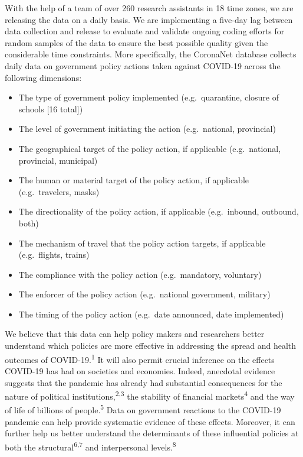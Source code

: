\documentclass[
]{article}
\providecommand{\tightlist}{%
  \setlength{\itemsep}{0pt}\setlength{\parskip}{0pt}}
\begin{document}
With the help of a team of over 260 research assistants in 18 time zones, we are releasing the data on a daily basis. We are implementing a five-day lag between data collection and release to evaluate and validate ongoing coding efforts for random samples of the data to ensure the best possible quality given the considerable time constraints. More specifically, the CoronaNet database collects daily data on government policy actions taken against COVID-19 across the following dimensions:

\begin{itemize}
\tightlist
\item
  The type of government policy implemented (e.g.~quarantine, closure of schools {[}16 total{]})
\item
  The level of government initiating the action (e.g.~national, provincial)
\item
  The geographical target of the policy action, if applicable (e.g.~national, provincial, municipal)
\item
  The human or material target of the policy action, if applicable (e.g.~travelers, masks)
\item
  The directionality of the policy action, if applicable (e.g.~inbound, outbound, both)
\item
  The mechanism of travel that the policy action targets, if applicable (e.g.~flights, trains)
\item
  The compliance with the policy action (e.g.~mandatory, voluntary)
\item
  The enforcer of the policy action (e.g.~national government, military)
\item
  The timing of the policy action (e.g.~date announced, date implemented)
\end{itemize}

We believe that this data can help policy makers and researchers better understand which policies are more effective in addressing the spread and health outcomes of COVID-19.\textsuperscript{1} It will also permit crucial inference on the effects COVID-19 has had on societies and economies. Indeed, anecdotal evidence suggests that the pandemic has already had substantial consequences for the nature of political institutions,\textsuperscript{2,3} the stability of financial markets\textsuperscript{4} and the way of life of billions of people.\textsuperscript{5} Data on government reactions to the COVID-19 pandemic can help provide systematic evidence of these effects. Moreover, it can further help us better understand the determinants of these influential policies at both the structural\textsuperscript{6,7} and interpersonal levels.\textsuperscript{8}
\end{document}
